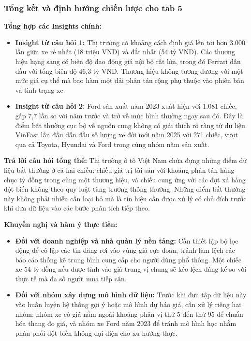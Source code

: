 \subsubsection{Tổng kết và định hướng chiến lược cho tab 5}
\label{subsubsec:tab5_summary}

\noindent\textbf{Tổng hợp các Insights chính:}
\begin{itemize}
    \item \textbf{Insight từ câu hỏi 1:} Thị trường có khoảng cách định giá lên tới hơn 3.000 lần giữa xe rẻ nhất (18 triệu VND) và đắt nhất (54 tỷ VND). Các thương hiệu hạng sang có biên độ dao động giá nội bộ rất lớn, trong đó Ferrari dẫn đầu với tổng biên độ 46,3 tỷ VND. Thương hiệu không tương đương với một mức giá cụ thể mà bao hàm một dải phân tán rộng phụ thuộc vào phiên bản và tình trạng xe.
    \item \textbf{Insight từ câu hỏi 2:} Ford sản xuất năm 2023 xuất hiện với 1.081 chiếc, gấp 7,7 lần so với năm trước và trở về mức bình thường ngay sau đó. Đây là điểm bất thường cục bộ về nguồn cung không có giải thích rõ ràng từ dữ liệu. VinFast lần đầu dẫn đầu số lượng xe đời mới năm 2025 với 271 chiếc, vượt qua cả Toyota, Hyundai và Ford trong cùng nhóm năm sản xuất.
\end{itemize}

\noindent\textbf{Trả lời câu hỏi tổng thể:} Thị trường ô tô Việt Nam chứa đựng những điểm dữ liệu bất thường ở cả hai chiều: chiều giá trị tài sản với khoảng phân tán hàng chục tỷ đồng trong cùng một thương hiệu, và chiều cung ứng với các đợt xả hàng đột biến không theo quy luật tăng trưởng thông thường. Những điểm bất thường này không phải nhiễu cần loại bỏ mà là tín hiệu cần được xử lý có chủ đích trước khi đưa dữ liệu vào các bước phân tích tiếp theo.

\noindent\textbf{Khuyến nghị và hàm ý thực tiễn:}
\begin{itemize}
    \item \textbf{Đối với doanh nghiệp và nhà quản lý nền tảng:} Cần thiết lập bộ lọc động để cô lập các tin đăng rơi vào vùng giá cực đoan, tránh làm lệch các báo cáo thống kê trung bình cung cấp cho người dùng phổ thông. Một chiếc xe 54 tỷ đồng nếu được tính vào giá trung vị chung sẽ kéo lệch đáng kể so với thực tế mà đa số người mua tiếp cận.
    \item \textbf{Đối với nhóm xây dựng mô hình dữ liệu:} Trước khi đưa tập dữ liệu này vào huấn luyện hệ thống gợi ý hoặc mô hình dự báo giá, cần xử lý riêng hai nhóm: nhóm xe có giá nằm ngoài khoảng phân vị thứ 5 đến thứ 95 để chuẩn hóa thang đo giá, và nhóm xe Ford năm 2023 để tránh mô hình học nhằm phân phối đột biến không đại diện cho xu hướng thực.
\end{itemize}

\clearpage
